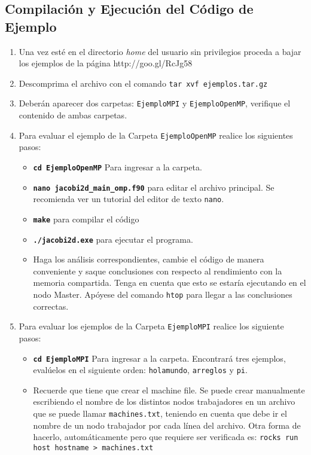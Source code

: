\documentclass[12pt]{article}
\begin{document}
\subsection{Compilación y Ejecución del Código de Ejemplo}
\begin{enumerate}
\item Una vez esté en el directorio \textit{home} del usuario sin privilegios proceda a bajar los ejemplos de la página http://goo.gl/RcJg58 
\item Descomprima el archivo con el comando \texttt{tar xvf ejemplos.tar.gz}
\item Deberán aparecer dos carpetas: \texttt{EjemploMPI} y \texttt{EjemploOpenMP}, verifique el contenido de ambas carpetas.
\item Para evaluar el ejemplo de la Carpeta \texttt{EjemploOpenMP} realice los siguientes pasos:
  \begin{itemize}
  \item \textbf{\texttt{cd EjemploOpenMP}} Para ingresar a la carpeta.
  \item \textbf{\texttt{nano jacobi2d\_main\_omp.f90}} para editar el archivo principal. Se recomienda ver un tutorial del editor de texto \texttt{nano}.
  \item \textbf{\texttt{make}} para compilar el código
  \item \textbf{\texttt{./jacobi2d.exe}} para ejecutar el programa.
  \item Haga los análisis correspondientes, cambie el código de manera conveniente y saque conclusiones con respecto al rendimiento con la memoria compartida. Tenga en cuenta que esto se estaría ejecutando en el nodo Master. Apóyese del comando \texttt{htop} para llegar a las conclusiones correctas.
  \end{itemize}
\item Para evaluar los ejemplos de la Carpeta \texttt{EjemploMPI} realice los siguiente pasos:
  \begin{itemize}
  \item \textbf{\texttt{cd EjemploMPI}} Para ingresar a la carpeta. Encontrará tres ejemplos, evalúelos en el siguiente orden: \texttt{holamundo}, \texttt{arreglos} y \texttt{pi}.
  \item Recuerde que tiene que crear el machine file. Se puede crear manualmente escribiendo el nombre de los distintos nodos trabajadores en un archivo que se puede llamar \texttt{machines.txt}, teniendo en cuenta que debe ir el nombre de un nodo trabajador por cada línea del archivo. Otra forma de hacerlo, automáticamente pero que requiere ser verificada es: \texttt{rocks run host hostname > machines.txt}

\end{itemize}
\end{enumerate}
\end{document}
